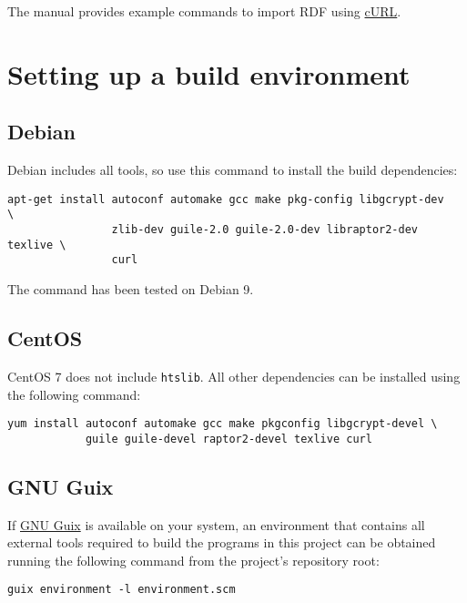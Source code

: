   The manual provides example commands to import RDF using
  \href{https://curl.haxx.se/}{cURL}.

\section{Setting up a build environment}

\subsection{Debian}

  Debian includes all tools, so use this command to install the
  build dependencies:

\begin{siderules}
\begin{verbatim}
apt-get install autoconf automake gcc make pkg-config libgcrypt-dev     \
                zlib-dev guile-2.0 guile-2.0-dev libraptor2-dev texlive \
                curl
\end{verbatim}
\end{siderules}

  The command has been tested on Debian 9.

\subsection{CentOS}

  CentOS 7 does not include \texttt{htslib}.  All other dependencies can
  be installed using the following command:

\begin{siderules}
\begin{verbatim}
yum install autoconf automake gcc make pkgconfig libgcrypt-devel \
            guile guile-devel raptor2-devel texlive curl
\end{verbatim}
\end{siderules}

\subsection{GNU Guix}

  If \href{https://www.gnu.org/software/guix}{GNU Guix} is available on your
  system, an environment that contains all external tools required to build
  the programs in this project can be obtained running the following command
  from the project's repository root:

\begin{siderules}
\begin{verbatim}
guix environment -l environment.scm
\end{verbatim}
\end{siderules}

